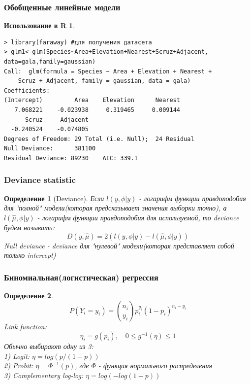 \documentclass{beamer}
\newtheorem{defn}{Определение}
\newtheorem{exmpr}{Использование в R}
\begin{document}
\begin{frame}[containsverbatim]
\frametitle{Обобщенные линейные модели}
\begin{exmpr}
\begin{verbatim}
> library(faraway) #для получения датасета
> glm1<-glm(Species~Area+Elevation+Nearest+Scruz+Adjacent,
data=gala,family=gaussian)
Call:  glm(formula = Species ~ Area + Elevation + Nearest + 
    Scruz + Adjacent, family = gaussian, data = gala)
Coefficients:
(Intercept)         Area    Elevation      Nearest  
   7.068221    -0.023938     0.319465     0.009144  
      Scruz     Adjacent  
  -0.240524    -0.074805  
Degrees of Freedom: 29 Total (i.e. Null);  24 Residual
Null Deviance:	    381100 
Residual Deviance: 89230 	AIC: 339.1 
\end{verbatim}
\end{exmpr}

\end{frame}


\begin{frame}
\frametitle{Deviance statistic}
\begin{defn}[Deviance]
Если $l(y,\phi|y)$ - логарифм функции правдоподобия для "полной" модели(которая предсказывает значения выборки точно), а $l(\hat{\mu},\phi|y)$ - логарифм функции правдоподобия для используемой, то deviance будем называть:
$$D(y,\hat{\mu})=2(l(y,\phi|y)-l(\hat{\mu},\phi|y))$$
Null deviance - deviance для "нулевой" модели(которая представляет собой только intercept)
\end{defn}
\end{frame}


\begin{frame}
\frametitle{Биномиальная(логистическая) регрессия}
\begin{defn}
$$P(Y_i=y_i)={n_i\choose y_i}p_i^{y_i}(1-p_i)^{n_i-y_i}$$
Link function:
$$\eta_i=g(p_i),\quad 0\leq g^{-1}(\eta)\leq 1$$
Обычно выбирают одну из 3:\\
1) Logit: $\eta=log(p/(1-p))$\\
2) Probit: $\eta=\Phi^{-1}(p)$, где $\Phi$ - функция нормального распределения\\
3) Complementary log-log: $\eta=log(-log(1-p))$
\end{defn}
\end{frame}
\end{document}
